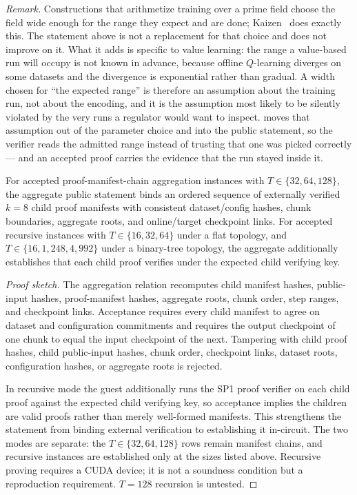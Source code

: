 \noindent\emph{Remark.} Constructions that arithmetize training over a prime
field choose the field wide enough for the range they expect and are done;
Kaizen~\cite{kaizen2024} does exactly this. The statement above is not a
replacement for that choice and does not improve on it. What it adds is
specific to value learning: the range a value-based run will occupy is not
known in advance, because offline $Q$-learning diverges on some datasets and
the divergence is exponential rather than gradual. A width chosen for ``the
expected range'' is therefore an assumption about the training run, not about
the encoding, and it is the assumption most likely to be silently violated by
the very runs a regulator would want to inspect.  moves
that assumption out of the parameter choice and into the public statement, so
the verifier reads the admitted range instead of trusting that one was picked
correctly --- and an accepted proof carries the evidence that the run stayed
inside it.

\begin{theorem}
\label{thm:manifest-aggregation}
For accepted proof-manifest-chain aggregation instances with
$T\in\{32,64,128\}$, the aggregate public statement binds an ordered sequence
of externally verified $k=8$ child proof manifests with consistent
dataset/config hashes, chunk boundaries, aggregate roots, and online/target
checkpoint links.  For accepted recursive instances with $T\in\{16,32,64\}$ under a
flat topology, and $T \in \{16, 1{,}248, 4{,}992\}$ under a binary-tree
topology, the aggregate additionally establishes that each child proof verifies
under the expected child verifying key.
\end{theorem}
\begin{proof}[Proof sketch]
The aggregation relation recomputes child manifest hashes, public-input hashes,
proof-manifest hashes, aggregate roots, chunk order, step ranges, and
checkpoint links.  Acceptance requires every child manifest to agree on dataset
and configuration commitments and requires the output checkpoint of one chunk
to equal the input checkpoint of the next.  Tampering with child proof hashes,
child public-input hashes, chunk order, checkpoint links, dataset roots,
configuration hashes, or aggregate roots is rejected.

In recursive mode the guest additionally runs the SP1 proof verifier on each
child proof against the expected child verifying key, so acceptance implies the
children are valid proofs rather than merely well-formed manifests.  This
strengthens the statement from binding external verification to establishing it
in-circuit.  The two modes are separate: the $T\in\{32,64,128\}$ rows remain
manifest chains, and recursive instances are established only at the sizes
listed above.  Recursive proving requires a CUDA device; it is not a soundness
condition but a reproduction requirement.  $T=128$ recursion is untested.
\end{proof}

